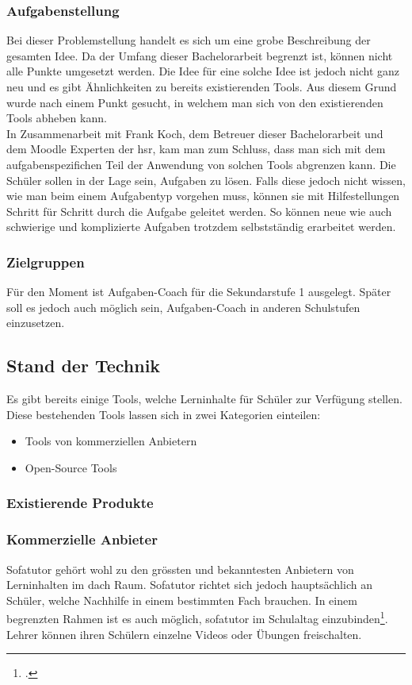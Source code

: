 \subsubsection{Aufgabenstellung}
Bei dieser Problemstellung handelt es sich um eine grobe Beschreibung der gesamten Idee. Da der Umfang dieser Bachelorarbeit begrenzt ist, können nicht alle Punkte umgesetzt werden. Die Idee für eine solche Idee ist jedoch nicht ganz neu und es gibt Ähnlichkeiten zu bereits existierenden Tools. Aus diesem Grund wurde nach einem Punkt gesucht, in welchem man sich von den existierenden Tools abheben kann. \\

In Zusammenarbeit mit Frank Koch, dem Betreuer dieser Bachelorarbeit und dem Moodle Experten der \gls{hsr}, kam man zum Schluss, dass man sich mit dem aufgabenspezifichen Teil der Anwendung von solchen Tools abgrenzen kann. Die Schüler sollen in der Lage sein, Aufgaben zu lösen. Falls diese jedoch nicht wissen, wie man beim einem Aufgabentyp vorgehen muss, können sie mit Hilfestellungen Schritt für Schritt durch die Aufgabe geleitet werden. So können neue wie auch schwierige und komplizierte Aufgaben trotzdem selbstständig erarbeitet werden. \\

\subsubsection{Zielgruppen}
Für den Moment ist Aufgaben-Coach für die Sekundarstufe 1 ausgelegt. Später soll es jedoch auch möglich sein, Aufgaben-Coach in anderen Schulstufen einzusetzen.

\subsection{Stand der Technik}
Es gibt bereits einige Tools, welche Lerninhalte für Schüler zur Verfügung stellen. Diese bestehenden Tools lassen sich in zwei Kategorien einteilen:
\begin{itemize}
	\item Tools von kommerziellen Anbietern
	\item Open-Source Tools
\end{itemize}

\subsubsection{Existierende Produkte}
\subsubsection*{Kommerzielle Anbieter}
Sofatutor gehört wohl zu den grössten und bekanntesten Anbietern von Lerninhalten im \gls{dach} Raum. Sofatutor richtet sich jedoch hauptsächlich an Schüler, welche Nachhilfe in einem bestimmten Fach brauchen. In einem begrenzten Rahmen ist es auch möglich, sofatutor im Schulaltag einzubinden\footcite{sofatutor_fuer_lehrer}. Lehrer können ihren Schülern einzelne Videos oder Übungen freischalten. \\


